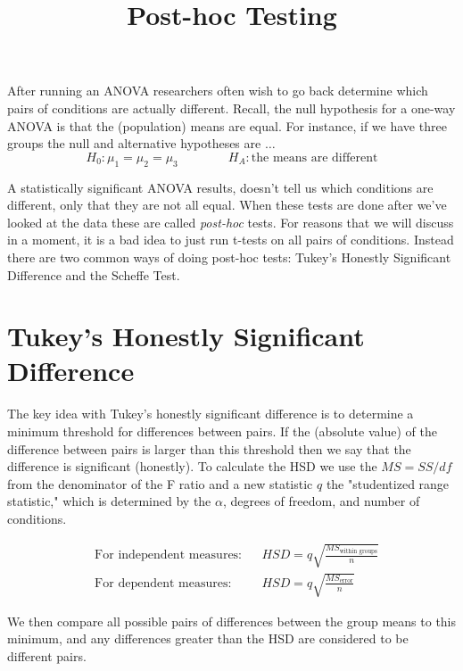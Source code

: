 \documentclass{tufte-handout}
\title{Post-hoc Testing}
\date{} %
\begin{document}
\maketitle%

\begin{fullwidth}
After running an ANOVA researchers often wish to go back determine which pairs of conditions are actually different. Recall, the null hypothesis for a one-way ANOVA is that the (population) means are equal. For instance, if we have three groups the null and alternative hypotheses are $\dots$ 
\begin{equation*}
H_0: \mu_1=\mu_2=\mu_3 \qquad \qquad H_A: \text{the means are different}
\end{equation*}

A statistically significant ANOVA results, doesn't tell us which conditions are different, only that they are not all equal. When these tests are done after we've looked at the data these are called \emph{post-hoc} tests. For reasons that we will discuss in a moment, it is a bad idea to just run t-tests on all pairs of conditions. Instead there are two common ways of doing post-hoc tests: Tukey's Honestly Significant Difference and the Scheffe Test.

\section{Tukey's Honestly Significant Difference}

The key idea with Tukey's honestly significant difference is to determine a minimum threshold for differences between pairs. If the (absolute value) of the difference between pairs is larger than this threshold then we say that the difference is significant (honestly). To calculate the HSD we use the $MS=SS/df$ from the denominator of the F ratio and a new statistic $q$ the "studentized range statistic," which is determined by the $\alpha$, degrees of freedom, and number of conditions.

\begin{align*}
&\text{For independent measures:}& &HSD=q\sqrt{\frac{MS_{\text{within groups}}}{n}}\\
&\text{For dependent measures:} & &HSD=q\sqrt{\frac{MS_{\text{error}}}{n}}
\end{align*}

We then compare all possible pairs of differences between the group means to this minimum, and any differences greater than the HSD are considered to be different pairs.


\end{fullwidth}
\end{document}
